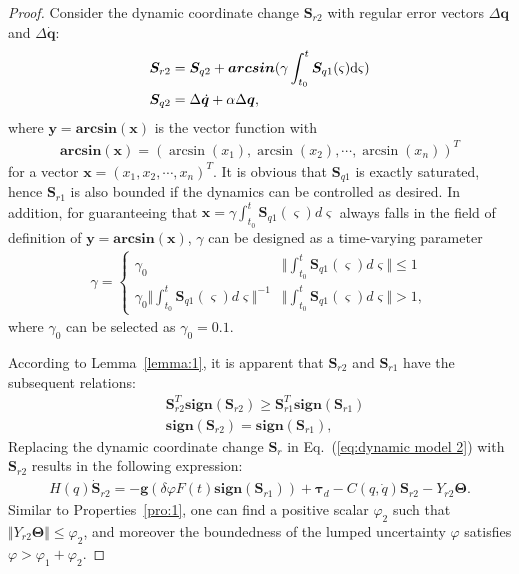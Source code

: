 \documentclass[3p]{elsarticle}
\theoremstyle{plain}
\theoremstyle{remark}
\begin{document}
\begin{proof}
Consider the dynamic coordinate change $\bm S_{r2}$ with regular error vectors $\Delta \bm q$ and $\Delta\dot{\bm q}$:
\begin{align}
\begin{split}
\bm S_{r2} &= \bm S_{q2}+\bm{arcsin}(\gamma\int^t_{t_0}\bm S_{q1}(\varsigma) \rm{d}\it{\varsigma})\\
\bm S_{q2} &= \Delta \dot {\bm q}+\alpha \Delta \bm q,
\end{split}
\end{align}
where $\bm y=\mathbf{arcsin}(\bm x)$ is the vector function with
\begin{align}
\mathbf{arcsin}(\bm x) = \left(\arcsin(x_1),\arcsin(x_2),\cdots,\arcsin(x_n)\right)^T
\end{align}
for a vector $\bm x=\left(x_1,x_2,\cdots,x_n\right)^T$. It is obvious that $\bm S_{q1}$ is exactly saturated, hence $\bm S_{r1}$ is also bounded if the dynamics can be controlled as desired. In addition, for guaranteeing that $\bm x=\gamma\int^t_{t_0}\bm S_{q1}(\varsigma) d\varsigma$ always falls in the field of definition of $\bm y=\mathbf{arcsin}(\bm x)$, $\gamma$ can be designed as a time-varying parameter
    \begin{align}
    \gamma=\begin{cases}
    \gamma_0&\Vert\int^t_{t_0}\bm S_{q1}(\varsigma) d\varsigma\Vert\le 1\\
    \gamma_0\Vert\int^t_{t_0}\bm S_{q1}(\varsigma) d\varsigma\Vert^{-1}&\Vert\int^t_{t_0}\bm S_{q1}(\varsigma) d\varsigma\Vert> 1,
    \end{cases}
    \end{align}
    where $\gamma_0$ can be selected as $\gamma_0=0.1$.

According to Lemma~\ref{lemma:1}, it is apparent that $\bm S_{r2}$ and $\bm S_{r1}$ have the subsequent relations:
\begin{align}
&\bm S_{r2}^T \mathbf{sign}(\bm S_{r2}) \ge  \bm S_{r1}^T \mathbf{sign}(\bm S_{r1})\\
&\mathbf{sign}(\bm S_{r2})=\mathbf{sign}(\bm S_{r1}),
\end{align}
Replacing the dynamic coordinate change $\bm S_r$ in Eq.~(\ref{eq:dynamic model 2}) with $\bm S_{r2}$ results in the following expression:
\begin{align}
H(q)\dot {\bm S}_{r2} = -\bm{g}(\delta\varphi F(t) \mathbf{sign}(\bm S_{r1}))+\bm\tau_d-C(q,\dot q)\bm S_{r2}-Y_{r2}\bm\Theta.
\end{align}
Similar to Properties~\ref{pro:1}, one can find a positive scalar $\varphi_2$ such that $\Vert Y_{r2}\bm\Theta\Vert\le\varphi_2$, and moreover the boundedness of the lumped uncertainty $\varphi$ satisfies $\varphi>\varphi_1+\varphi_2$.


\end{proof}
\end{document}
